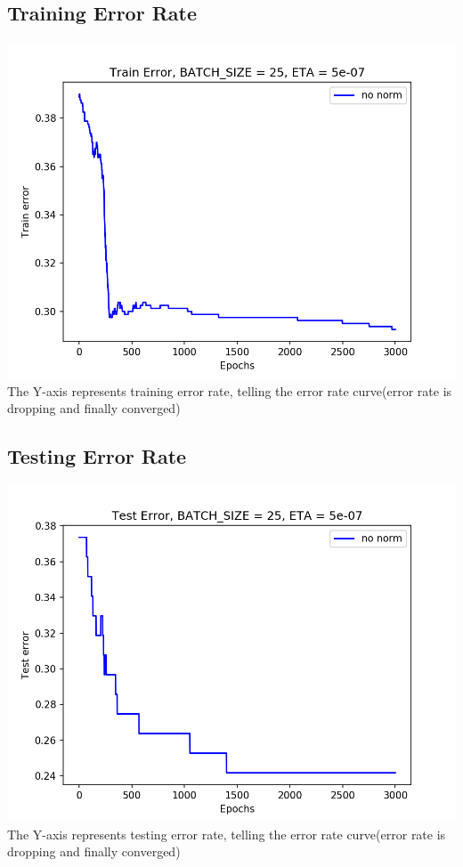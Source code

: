 \documentclass[11pt, a4paper]{article} %
\begin{document}
\subsection{Training Error Rate} %
\includegraphics[scale = 0.8]{figure/TRE_3.png}
\\ The Y-axis represents training error rate, telling the error rate curve(error rate is dropping and finally converged)

\subsection{Testing Error Rate} %
\includegraphics[scale = 0.8]{figure/TEE_3.png}
\\ The Y-axis represents testing error rate, telling the error rate curve(error rate is dropping and finally converged)
\end{document}
